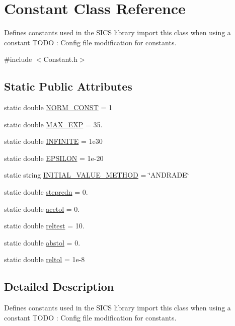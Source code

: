 \hypertarget{classConstant}{}\section{Constant Class Reference}
\label{classConstant}


Defines constants used in the S\+I\+C\+S library import this class when using a constant T\+O\+D\+O \+: Config file modification for constants.  




{\ttfamily \#include $<$Constant.\+h$>$}

\subsection*{Static Public Attributes}
\begin{DoxyCompactItemize}
\item 
static double \hyperlink{classConstant_aaf334273fc82a586936f00df7ec30149}{N\+O\+R\+M\+\_\+\+C\+O\+N\+S\+T} = 1
\item 
static double \hyperlink{classConstant_ae5c89860fb1308141f626ba360825f88}{M\+A\+X\+\_\+\+E\+X\+P} = 35.
\item 
static double \hyperlink{classConstant_a37bff4b53634ef172c8d87eded8d29bf}{I\+N\+F\+I\+N\+I\+T\+E} = 1e30
\item 
static double \hyperlink{classConstant_ad5b72f523946f768cdff18907e43155e}{E\+P\+S\+I\+L\+O\+N} = 1e-\/20
\item 
static string \hyperlink{classConstant_ae499a37885b6c873530a91243fd04bdf}{I\+N\+I\+T\+I\+A\+L\+\_\+\+V\+A\+L\+U\+E\+\_\+\+M\+E\+T\+H\+O\+D} = \char`\"{}A\+N\+D\+R\+A\+D\+E\char`\"{}
\item 
static double \hyperlink{classConstant_acc69323a1f124d4b8ed7257e0574a9eb}{stepredn} = 0.
\item 
static double \hyperlink{classConstant_a9fac745f9115a5e2026761c02b5df1d7}{acctol} = 0.
\item 
static double \hyperlink{classConstant_a3aefd0d2fdfb90049600c25ebcaa41e1}{reltest} = 10.
\item 
static double \hyperlink{classConstant_ae9ad78ce3b1627c1045f78a1045f9d82}{abstol} = 0.
\item 
static double \hyperlink{classConstant_a46062856afe6595162139069f1157d64}{reltol} = 1e-\/8
\end{DoxyCompactItemize}


\subsection{Detailed Description}
Defines constants used in the S\+I\+C\+S library import this class when using a constant T\+O\+D\+O \+: Config file modification for constants. 

